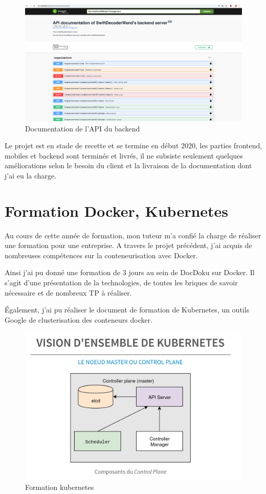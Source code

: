 \documentclass[11pt]{report}
\begin{document}
			\begin{figure}[!htb]
				\center
				\includegraphics[scale = 0.2]{api.png}
				\caption{Documentation de l'API du backend}
			\end{figure}

			Le projet est en stade de recette et se termine en début 2020, les parties frontend, mobiles et backend sont terminés et livrés, il ne subsiste seulement quelques améliorations selon le besoin du client et la livraison de la documentation dont j'ai eu la charge.

		\newpage

		\section{Formation Docker, Kubernetes}

		Au cours de cette année de formation, mon tuteur m'a confié la charge de réaliser une formation pour une entreprise.
		A travers le projet précédent, j'ai acquis de nombreuses compétences sur la conteneurisation avec Docker.

		Ainsi j'ai pu donné une formation de 3 jours au sein de DocDoku sur Docker. Il s'agit d'une présentation de la technologies, de toutes les briques de savoir nécessaire et de nombreux TP à réaliser.

		Également, j'ai pu réaliser le document de formation de Kubernetes, un outils Google de clusterisation des conteneurs docker.

			\begin{figure}[!htb]
				\center
				\includegraphics[scale = 0.2]{k8s.png}
				\caption{Formation kubernetes}
			\end{figure}
\end{document}
